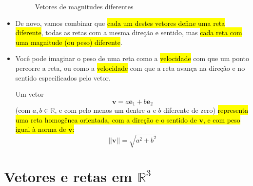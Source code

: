 \documentclass[
  letterpaper,
  DIV=11,
  numbers=noendperiod]{scrreprt}
\begin{document}
\begin{itemize}
\begin{figure}[t]
{  }

  \caption{\label{fig-vetores}Vetores de magnitudes diferentes}

  \end{figure}
\item
  De novo, vamos combinar que {\hl{cada um destes vetores define uma
  reta diferente}}, todas as retas com a mesma direção e sentido, mas
  {\hl{cada reta com uma magnitude (ou peso) diferente}}.
\item
  Você pode imaginar o peso de uma reta como a {\hl{velocidade}} com que
  um ponto percorre a reta, ou como a {\hl{velocidade}} com que a reta
  avança na direção e no sentido especificados pelo vetor.

  \begin{tcolorbox}[standard jigsaw,toprule=.15mm, bottomrule=.15mm, opacityback=0, toptitle=1mm, bottomtitle=1mm, colbacktitle=quarto-callout-note-color!10!white, left=2mm, titlerule=0mm, title=\textcolor{quarto-callout-note-color}{\faInfo}\hspace{0.5em}{Resumindo: vetores \(=\) retas homogêneas orientadas e com peso}, arc=.35mm, rightrule=.15mm, colback=white, coltitle=black, colframe=quarto-callout-note-color-frame, opacitybacktitle=0.6, leftrule=.75mm]
  Um vetor \[
  \mathbf{v} = a\mathbf{e}_{1} + b\mathbf{e}_{2}
  \] (com $a, b \in \mathbb{R}$, e com pelo menos um dentre $a$ e $b$
  diferente de zero) {\hl{representa uma reta homogênea orientada, com a
  direção e o sentido de $\mathbf{v}$, e com peso igual à norma de
  $\mathbf{v}$:}} \[
  ||\mathbf{v}|| = \sqrt{a^2 + b^2}
  \]
  \end{tcolorbox}
\end{itemize}

\hypertarget{vetores-e-retas-em-mathbbr3}{%
\section{\texorpdfstring{Vetores e retas em
$\mathbb{R}^3$}{Vetores e retas em }}\label{vetores-e-retas-em-mathbbr3}}
\end{document}
